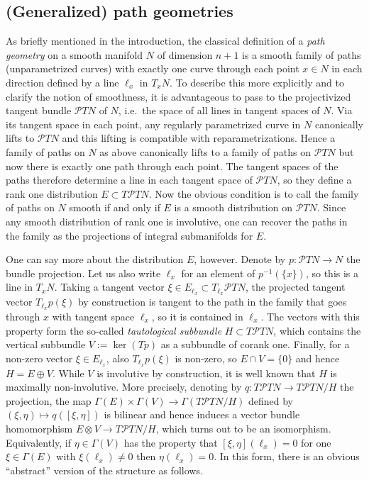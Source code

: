 \documentclass[11pt]{amsart}
\numberwithin{proposition}{section}
\numberwithin{equation}{section}
\begin{document}
\subsection{(Generalized) path geometries}\label{2.1}
As briefly mentioned in the introduction, the classical definition of a \textit{path geometry} on a smooth manifold $N$ of dimension $n+1$ is a smooth family of paths (unparametrized curves) with exactly one curve through each point $x\in N$ in each direction defined by a line $\ell_x$ in $T_xN$. To describe this more explicitly and to clarify the notion of smoothness, it is advantageous to pass to the projectivized tangent bundle $\mathcal PTN$ of $N$, i.e.\ the space of all lines in tangent spaces of $N$. Via its tangent space in each point, any regularly parametrized curve in $N$ canonically lifts to $\mathcal PTN$ and this lifting is compatible with reparametrizations. Hence a family of paths on $N$ as above canonically lifts to a family of paths on $\mathcal PTN$ but now there is exactly one path through each point. The tangent spaces of the paths therefore determine a line in each tangent space of $\mathcal PTN$, so they define a rank one distribution $E\subset T\mathcal PTN$. Now the obvious condition is to call the family of paths on $N$ smooth if and only if $E$ is a smooth distribution on $\mathcal PTN$. Since any smooth distribution of rank one is involutive, one can recover the paths in the family as the projections of integral submanifolds for $E$. 

One can say more about the distribution $E$, however. Denote by $p:\mathcal PTN\to N$ the bundle projection. Let us also write $\ell_x$ for an element of $p^{-1}(\{x\})$, so this is a line in $T_xN$. Taking a tangent vector $\xi\in E_{\ell_x}\subset T_{\ell_x}\mathcal PTN$, the projected tangent vector $T_{\ell_x}p(\xi)$ by construction is tangent to the path in the family that goes through $x$ with tangent space $\ell_x$, so it is contained in $\ell_x$. The vectors with this property form the so-called \textit{tautological subbundle} $H\subset T\mathcal PTN$, which contains the vertical subbundle $V:=\ker(Tp)$ as a subbundle of corank one. Finally, for a non-zero vector $\xi\in E_{\ell_x}$, also $T_{\ell_x}p(\xi)$ is non-zero, so $E\cap V=\{0\}$ and hence $H=E\oplus V$. While $V$ is involutive by construction, it is well known that $H$ is maximally non-involutive. More precisely, denoting by $q:T\mathcal PTN\to T\mathcal PTN/H$ the projection, the map $\Gamma(E)\times\Gamma(V)\to \Gamma(T\mathcal PTN/H)$ defined by $(\xi,\eta)\mapsto q([\xi,\eta])$ is bilinear and hence induces a vector bundle homomorphism $E\otimes V\to T\mathcal PTN/H$, which turns out to be an isomorphism. Equivalently, if $\eta\in\Gamma(V)$ has the property that $[\xi,\eta](\ell_x)=0$ for one $\xi\in\Gamma(E)$ with $\xi(\ell_x)\neq 0$ then $\eta(\ell_x)=0$. In this form, there is an obvious ``abstract'' version of the structure as follows.
\end{document}
